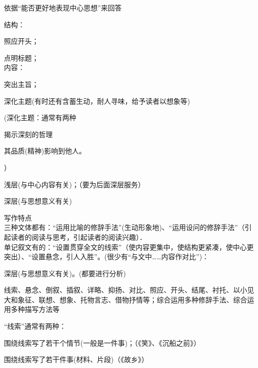 依据``能否更好地表现中心思想''来回答

结构：\begin{asparaenum}[(1)]\item 照应开头；
        \item 点明标题；\\
内容：\item 突出主旨；
        \item 深化主题(有时还有含蓄生动，耐人寻味，给予读者以想象等)\end{asparaenum}
        (深化主题：通常有两种\begin{inparaenum}[(1)]\item 揭示深刻的哲理\item 其品质(精神)影响到他人。\end{inparaenum}）

\begin{asparaenum}[(1)]
\item 浅层(与中心内容有关)；（要为后面深层服务）
\item 深层(与思想意义有关)
\end{asparaenum}

\begin{asparaenum}[(1)]
\item 写作特点\\
三种文体都有：``运用比喻的修辞手法''(生动形象地)、``运用设问的修辞手法''（引起读者的阅读与思考，引起读者的阅读兴趣）．\\
单记叙文有的：``设置贯穿全文的线索''（使内容更集中，使结构更紧凑，使中心更突出）、``设置悬念，引人入胜''。(很少有``与文中\ldots{}\ldots{}内容作对比'')：\\
\item 深层(与思想意义有关)。(都要进行分析)
\end{asparaenum}

线索、悬念、倒叙、插叙、详略、抑扬、对比、照应、开头、结尾、衬托、以小见大和象征、联想、想象、托物言志、借物抒情等；综合运用多种修辞手法、综合运用多种描写方法等\par
``线索''通常有两种：\begin{asparaenum}[(1)]\item 围绕线索写了若干个情节(一般是一件事)；（《笑》、《沉船之前》）
                      \item 围绕线索写了若干件事(材料、片段)（《故乡》）\end{asparaenum}

